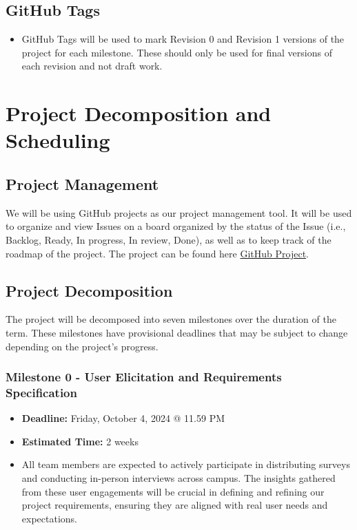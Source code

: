 \documentclass{article}
\begin{document}
\subsection{GitHub Tags}
\begin{itemize}
    \item GitHub Tags will be used to mark Revision 0 and Revision 1 versions of
    the project for each milestone. These should only be used for final versions
    of each revision and not draft work.
\end{itemize}

\newpage

\section{Project Decomposition and Scheduling}

\subsection{Project Management}
We will be using GitHub projects as our project management tool. It will be used
to organize and view Issues on a board organized by the status of the Issue
(i.e., Backlog, Ready, In progress, In review, Done), as well as to keep track
of the roadmap of the project. The project can be found here
\href{https://github.com/orgs/PlutosCapstone/projects/1/views/1}{GitHub
Project}.

\subsection{Project Decomposition}
The project will be decomposed into seven milestones over the duration of the
term. These milestones have provisional deadlines that may be subject to change
depending on the project's progress.

\subsubsection*{Milestone 0 - User Elicitation and Requirements Specification}
\begin{itemize}
    \item \textbf{Deadline:} Friday, October 4, 2024 @ 11.59 PM
    \item \textbf{Estimated Time:} 2 weeks
    \item All team members are expected to actively participate in distributing
    surveys and conducting in-person interviews across campus. The insights
    gathered from these user engagements will be crucial in defining and
    refining our project requirements, ensuring they are aligned with real user
    needs and expectations.
\end{itemize}
\end{document}
